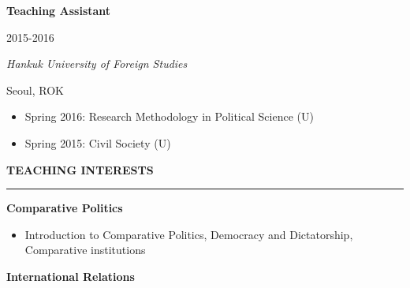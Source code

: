\documentclass[
  16,
]{article}
\providecommand{\tightlist}{%
  \setlength{\itemsep}{0pt}\setlength{\parskip}{0pt}}\usepackage{longtable,booktabs,array}
\begin{document}
\begin{large}
  \begin{multicols}{2}
    \begin{flushleft}{\bf Teaching Assistant}\end{flushleft}
    \begin{flushright}2015-2016\end{flushright}
  \end{multicols}
  \vspace{-0.17cm}
  \begin{multicols}{2}
    \begin{flushleft}\textit{Hankuk University of Foreign Studies}\end{flushleft}
    \begin{flushright}Seoul, ROK\end{flushright}
  \end{multicols}
  \end{large}
\vspace{-0.16cm}

\begin{itemize}
\tightlist
\item
  Spring 2016: Research Methodology in Political Science (U)
\item
  Spring 2015: Civil Society (U)
\end{itemize}

\vspace{7pt}

\begin{large}{\bf TEACHING INTERESTS}
  \vspace{3pt}
  \hrule
  \begin{multicols}{2}
    \begin{flushleft}{\bf Comparative Politics}\end{flushleft}
    \begin{flushright}\end{flushright}
  \end{multicols}
\end{large}
\vspace{-0.16cm}

\begin{itemize}
\tightlist
\item
  Introduction to Comparative Politics, Democracy and Dictatorship,
  Comparative institutions
\end{itemize}

\vspace{7pt}

\begin{large}
  \begin{multicols}{2}
    \begin{flushleft}{\bf International Relations}\end{flushleft}
    \begin{flushright}\end{flushright}
  \end{multicols}
\end{large}
\vspace{-0.16cm}
\end{document}
